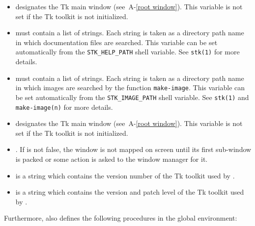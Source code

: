 \begin{itemize}

\item {\tt{}} designates the Tk main
      window (see~A-\ref{root window}). This variable is not set if
      the Tk toolkit is not initialized.

\item {\tt{}} must contain a list of
  strings.  Each string is taken as a directory path name in which
  documentation files are searched. This variable can be set
  automatically from the {\tt STK\_HELP\_PATH} shell variable. See
  {\tt stk(1)} for more details.

\item {\tt{}} must contain 
  a list of  strings.  Each string is taken as a directory path name in which
  images are searched by the function \texttt{make-image}. This variable can be
  set automatically from the {\tt STK\_IMAGE\_PATH} shell variable. See
  {\tt stk(1)}  and {\tt make-image(n)} for more details.

\item {\tt{}} designates the Tk main
      window (see~A-\ref{root window}). This variable is not set if
      the Tk toolkit is not initialized.

\item {\tt{}}. If  
   is not false, the  window 
  is not mapped on screen until its first sub-window is packed or some
  action is asked to the window manager for it.

\item {\tt{}} is a string 
  which contains the version number of the Tk toolkit used by {\stk}.

\item {\tt{}} is
  a string  which contains the version and patch level of the Tk toolkit 
  used by {\stk}.

\end{itemize}

Furthermore, {\stk} also defines the following procedures in the global 
environment:

